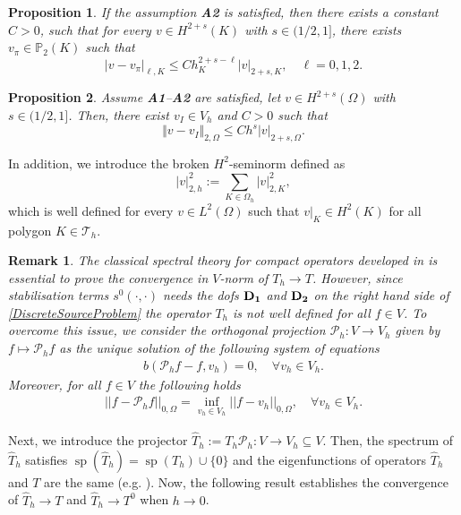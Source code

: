 \documentclass[final,reqno]{elsarticle}
\newtheorem{remark}{Remark}[section]
\newtheorem{proposition}{Proposition}[section]
\def\CT{\mathcal{T}}
\def\E{K}
\def\O{\Omega}
\def\P{\mathbb{P}}
\def\sp{\mathop{\mathrm{sp}}\nolimits}
\def\HdsO{{H^{2+s}(\O)}}
\begin{document}
\begin{proposition}\label{app1}
If the assumption {\bf A2} is satisfied, then there exists a constant
$C>0$, such that for every $v\in H^{2+s}(\E)$ with $s\in(1/2,1]$,
there exists $v_{\pi}\in\P_{2}(\E)$ such that
$$\vert v-v_{\pi}\vert_{\ell,\E}\le Ch_{\E}^{2+s-\ell}\vert v\vert_{2+s,\E}, \quad \ell=0,1,2.$$
\end{proposition}
\begin{proposition}\label{app2}
Assume {\textbf{A1}--\textbf{A2}} are satisfied,
let $v\in\HdsO$ with $s\in(1/2,1]$. Then, there exist $v_{I}\in V_h  $
and $C>0$ such that
$$\Vert v-v_{I}\Vert_{2,\O}\le Ch^s\vert v\vert_{2+s,\O}.$$
\end{proposition}
\noindent In addition, we introduce the broken $H^{2}$-seminorm defined as
$$|v|_{2,h}^{2}:=\sum_{\E\in\Omega_h}|v|_{2,\E}^{2},$$
which is well defined for every $v\in L^{2}(\O)$ such that
$v|_{\E}\in H^{2}(\E)$ for all polygon $\E\in \CT_{h}$. 



\begin{remark}
The classical spectral theory for compact operators developed in \cite{BO} is essential to prove the convergence in $V$-norm of $T_h \to T$. However, since stabilisation terms $s^0(\cdot,\cdot)$ needs the dofs ${\bf D_1}$ and ${\bf D_2}$ on the right hand side of \eqref{DiscreteSourceProblem} 
the operator $T_h$ is not well defined for all  $f\in V$.  To overcome this issue, we consider the orthogonal projection 
$\mathcal{P}_h:V\to V_h$ given by $f\mapsto \mathcal{P}_hf$ as the unique solution of the following system of equations
\begin{align*}
b(\mathcal{P}_hf-f,v_h)=0,\quad \forall v_h\in V_h.
\end{align*}
Moreover, for all $f\in V$ the following holds
\begin{align*}
|| f- \mathcal{P}_hf||_{0,\Omega}=\inf\limits_{v_h\in V_h} ||f-v_h ||_{0,\Omega}, \quad \forall v_h\in V_h.
\end{align*}
\end{remark}

Next, we introduce the projector $\widehat{T}_h:=T_h\mathcal{P}_h: V\to V_h\subseteq V$. Then, the spectrum of $\widehat{T}_h$ satisfies $\sp(\widehat{T}_h)=\sp(T_h) \cup \{0\}$ and the eigenfunctions of operators $\widehat{T}_h$ and $T$ are the same (e.g. \cite{MR2019}). Now, the following result establishes the convergence of  $\widehat{T}_h\to T$ and $\widehat{T}_h\to T^0$ when $h\to 0$.
\end{document}
